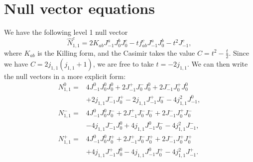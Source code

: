 \documentclass[10pt,a4paper]{article}
\theoremstyle{definition}
\theoremstyle{plain}
\theoremstyle{remark}
\numberwithin{equation}{section}
\begin{document}
\section{Null vector equations}
We have the following level 1 null vector \cite{Stocco:2022gah}
\begin{equation}
    \hat{N}^{c}_{1,1} = 2 K_{ab} J^{a}_{-1} J^{b}_{0} J^{c}_{0} - t f^{c}_{ab} J^{a}_{-1} J^{b}_{0} - t^{2} J^{c}_{-1},
\end{equation}
where $K_{ab}$ is the Killing form, and the Casimir takes the value $C = t^{2} - \frac{t}{2}$. Since we have $C = 2 j_{1,1}(j_{1,1}+1)$, 
we are free to take $t = -2 j_{1,1}$. We can then write the null vectors in a more explicit form:
\begin{equation}
    \begin{aligned}
        N^{0}_{1,1} =&4 J^{0}_{-1} J^{0}_{0} J^{0}_{0} + 2 J^{+}_{-1} J^{-}_{0} J^{0}_{0}  + 2 J^{-}_{-1} J^{+}_{0} J^{0}_{0} \\
                    & +2 j_{1,1} J^{-}_{-1} J^{+}_{0} - 2 j_{1,1} J^{+}_{-1} J^{-}_{0} - 4 j^{2}_{1,1} J^{0}_{-1},\\
        N^{-}_{1,1} =&4 J^{0}_{-1} J^{0}_{0} J^{-}_{0} + 2 J^{+}_{-1} J^{-}_{0} J^{-}_{0}  + 2 J^{-}_{-1} J^{+}_{0} J^{-}_{0} \\
                    & -4 j_{1,1} J^{-}_{-1} J^{0}_{0} + 4 j_{1,1} J^{0}_{-1} J^{-}_{0} - 4 j^{2}_{1,1} J^{-}_{-1},\\
        N^{+}_{1,1} =&4 J^{0}_{-1} J^{0}_{0} J^{+}_{0} + 2 J^{+}_{-1} J^{-}_{0} J^{+}_{0}  + 2 J^{-}_{-1} J^{+}_{0} J^{+}_{0} \\
                    & +4 j_{1,1} J^{+}_{-1} J^{0}_{0} - 4 j_{1,1} J^{0}_{-1} J^{+}_{0} - 4 j^{2}_{1,1} J^{+}_{-1}.
    \end{aligned}
\end{equation}
\end{document}
